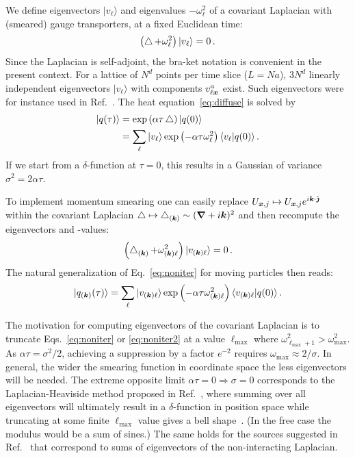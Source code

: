 We define eigenvectors $|v_{\ell}\rangle$ and eigenvalues $-\omega_{\ell}^2$
of a covariant Laplacian with (smeared) gauge transporters,
at a fixed Euclidean time:
\begin{equation}
\label{eq:eigen}
\left(\mathop{{}\bigtriangleup}\nolimits +\omega_\ell^2\right)|v_{\ell}\rangle=0\,.
\end{equation}
Since the Laplacian is self-adjoint, the bra-ket notation is convenient
in the present context.
For a lattice of $N^d$ points per time slice ($L=Na$), $3N^d$ 
linearly independent eigenvectors $|v_{\ell}\rangle$ with
components $v^{a}_{\ell\boldsymbol{x}}$ exist.
Such eigenvectors were for instance used in Ref.~\cite{Peardon:2009gh}.
The heat equation~\eqref{eq:diffuse} is solved by
\begin{align}
|q(\tau)\rangle&=\exp\left(\alpha\tau\mathop{{}\bigtriangleup}\nolimits\right)|q(0)\rangle\nonumber\\
&=\sum_{\ell}| v_{\ell}\rangle\exp\left(-\alpha\tau\omega_{\ell}^2\right)\langle v_{\ell}|q(0)\rangle
\,.\label{eq:noniter}
\end{align}
If we start from a $\delta$-function at $\tau=0$, this results in a Gaussian of
variance $\sigma^2=2\alpha\tau$.

To implement momentum smearing one
can easily replace $U_{\boldsymbol{x},j}\mapsto U_{\boldsymbol{x},j}e^{i\boldsymbol{k}\cdot\hat{\boldsymbol{\jmath}}}$
within the covariant Laplacian $\mathop{{}\bigtriangleup}\nolimits\mapsto\mathop{{}\bigtriangleup}\nolimits_{(\boldsymbol{k})}\sim
(\boldsymbol{\nabla}+i\boldsymbol{k})^2$ and then
recompute the eigenvectors and -values:
\begin{equation}
\label{eq:eigen2}
\left(\mathop{{}\bigtriangleup}\nolimits_{(\boldsymbol{k})} +\omega_{(\boldsymbol{k})\ell}^2\right)|v_{(\boldsymbol{k})\ell}\rangle=0\,.
\end{equation}
The natural generalization of Eq.~\eqref{eq:noniter} for moving
particles then reads:
\begin{equation}
|q_{(\boldsymbol{k})}(\tau)\rangle
=\sum_{\ell}| v_{(\boldsymbol{k})\ell}\rangle\exp\left(-\alpha\tau\omega_{(\boldsymbol{k})\ell}^2\right)\langle v_{(\boldsymbol{k})\ell}|q(0)\rangle
\,.
\label{eq:noniter2}
\end{equation}

The motivation for computing eigenvectors of the covariant
Laplacian is to truncate Eqs.~\eqref{eq:noniter} or \eqref{eq:noniter2}
at a value $\ell_{\max}$ where $\omega_{\ell_{\max}+1}^2>\omega_{\max}^2$.
As $\alpha\tau=\sigma^2/2$, achieving a suppression by a
factor $e^{-2}$ requires $\omega_{\max}\approx 2/\sigma$.
In general, the wider the smearing function in coordinate space
the less eigenvectors will be needed. The extreme opposite
limit $\alpha\tau=0\Rightarrow\sigma=0$ corresponds to the Laplacian-Heaviside
method proposed in Ref.~\cite{Peardon:2009gh}, where summing over all
eigenvectors will ultimately result in
a $\delta$-function in position space while truncating 
at some finite $\ell_{\max}$ value
gives a bell shape~\cite{Peardon:2009gh}. (In the free case
the modulus would be a sum of sines.) The same holds for
the sources suggested in Ref.~\cite{Brown:2012tm} that correspond to
sums of eigenvectors of the non-interacting Laplacian.


